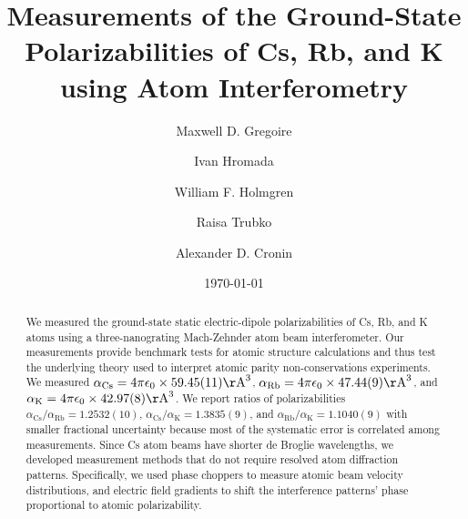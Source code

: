 \documentclass[twocolumn,prl,showpacs,superscriptaddress]{revtex4-1}   %
\newcommand{\ak}{\alpha_{\textrm{K}}}
\newcommand{\arb}{\alpha_{\textrm{Rb}}}
\newcommand{\acs}{\alpha_{\textrm{Cs}}}
\newcommand{\polKSysOnly}{42.97(8)}
\newcommand{\polRbSysOnly}{47.44(9)}
\newcommand{\polCsSysOnly}{59.45(11)}
\newcommand{\ratRbK}{1.1040(9)}
\newcommand{\ratCsK}{1.3835(9)}
\newcommand{\ratCsRb}{1.2532(10)}
\newcommand{\AAA}{\mathrm{\AA}}
\begin{document}
\title{Measurements of the Ground-State Polarizabilities of Cs, Rb, and K using Atom Interferometry}

\author{Maxwell D. Gregoire}
\author{Ivan Hromada}
\author{William F. Holmgren}
\author{Raisa Trubko}
\author{Alexander D. Cronin}

\date{\today}





\begin{abstract}
We measured the ground-state static electric-dipole polarizabilities of Cs, Rb, and K atoms using a three-nanograting Mach-Zehnder atom beam interferometer. Our measurements provide benchmark tests for atomic structure calculations and thus test the underlying theory used to interpret atomic parity non-conservations experiments. We measured $\acs = 4\pi\epsilon_0 \times \polCsSysOnly \AAA^3$, $\arb = 4\pi\epsilon_0 \times \polRbSysOnly \AAA^3$, and $\ak = 4\pi\epsilon_0 \times \polKSysOnly \AAA^3$. We report ratios of polarizabilities $\acs/\arb = \ratCsRb$, $\acs/\ak = \ratCsK$, and $\arb/\ak = \ratRbK$ with smaller fractional uncertainty because most of the systematic error is correlated among measurements. 
Since Cs atom beams have shorter de Broglie wavelengths, we developed measurement methods that do not require resolved atom diffraction patterns.
Specifically, we used phase choppers to measure atomic beam velocity distributions, and electric field gradients to shift the interference patterns' phase proportional to atomic polarizability.
\end{abstract}





\maketitle
\end{document}
